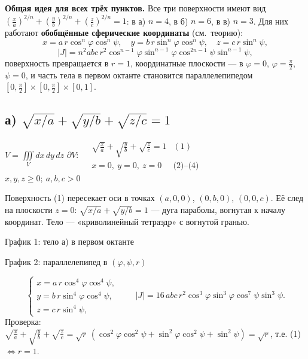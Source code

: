 \textbf{Общая идея для всех трёх пунктов.} Все три поверхности имеют вид $\left(\frac xa\right)^{2/n}+\left(\frac yb\right)^{2/n}+\left(\frac zc\right)^{2/n}=1$: в а) $n=4$, в б) $n=6$, в в) $n=3$. Для них работают \textbf{обобщённые сферические координаты} (см.\ теорию):
\[
x=a\,r\cos^n\varphi\cos^n\psi,\quad y=b\,r\sin^n\varphi\cos^n\psi,\quad z=c\,r\sin^n\psi,
\]
\[
|J|=n^2abc\,r^2\cos^{n-1}\varphi\sin^{n-1}\varphi\cos^{2n-1}\psi\sin^{n-1}\psi,
\]
поверхность превращается в $r=1$, координатные плоскости --- в $\varphi=0$, $\varphi=\frac\pi2$, $\psi=0$, и часть тела в первом октанте становится параллелепипедом $[0,\frac\pi2]\times[0,\frac\pi2]\times[0,1]$.

\subsection*{а) $\sqrt{x/a}+\sqrt{y/b}+\sqrt{z/c}=1$}

\begin{shapka}
$\displaystyle V=\iiint\limits_{V}dx\,dy\,dz$
\tcblower
$\partial V:\quad
\begin{array}{ll}
\sqrt{\frac xa}+\sqrt{\frac yb}+\sqrt{\frac zc}=1 & (1)\\
x=0,\ y=0,\ z=0 & \text{(2)--(4)}
\end{array}$\\[1mm]
$x,y,z\geqslant0;\ a,b,c>0$
\end{shapka}

Поверхность (1) пересекает оси в точках $(a,0,0)$, $(0,b,0)$, $(0,0,c)$. Её след на плоскости $z=0$: $\sqrt{x/a}+\sqrt{y/b}=1$ --- дуга параболы, вогнутая к началу координат. Тело --- «криволинейный тетраэдр» с вогнутой гранью.

\begin{center}
\begin{minipage}[t]{0.49\linewidth}\centering
{}

\small График 1: тело а) в первом октанте
\end{minipage}\hfill
\begin{minipage}[t]{0.49\linewidth}\centering
{}

\small График 2: параллелепипед в $(\varphi,\psi,r)$
\end{minipage}
\end{center}

\[
\begin{cases}x=a\,r\cos^4\varphi\cos^4\psi,\\ y=b\,r\sin^4\varphi\cos^4\psi,\\ z=c\,r\sin^4\psi,\end{cases}
\qquad |J|=16\,abc\,r^2\cos^3\varphi\sin^3\varphi\cos^7\psi\sin^3\psi .
\]
Проверка: $\sqrt{\frac xa}+\sqrt{\frac yb}+\sqrt{\frac zc}=\sqrt r\,(\cos^2\varphi\cos^2\psi+\sin^2\varphi\cos^2\psi+\sin^2\psi)=\sqrt r$, т.е. (1) $\iff r=1$.

